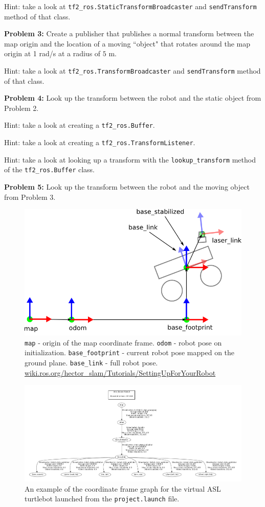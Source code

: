\documentclass{article}
\begin{document}
Hint: take a look at \texttt{tf2\_ros.StaticTransformBroadcaster} and \texttt{sendTransform} method of that class.

\textbf{Problem 3:} Create a publisher that publishes a normal transform between the map origin and the location of a moving ``object" that rotates around the map origin at 1 rad/s at a radius of $5$ m.

Hint: take a look at \texttt{tf2\_ros.TransformBroadcaster} and \texttt{sendTransform} method of that class.

\textbf{Problem 4:} Look up the transform between the robot and the static object from Problem 2.

Hint: take a look at creating a \texttt{tf2\_ros.Buffer}.

Hint: take a look at creating a \texttt{tf2\_ros.TransformListener}.

Hint: take a look at looking up a transform with the \texttt{lookup\_transform} method of the \texttt{tf2\_ros.Buffer} class.

\textbf{Problem 5:} Look up the transform between the robot and the moving object from Problem 3.

\newpage
\begin{figure}[H]
\centering
\includegraphics[width=0.5\linewidth]{s9/figs/coordsystems_img.png}
\caption{\texttt{map} - origin of the map coordinate frame. \texttt{odom} - robot pose on initialization. \texttt{base\_footprint} - current robot pose mapped on the ground plane. \texttt{base\_link} - full robot pose. 
\href{http://wiki.ros.org/hector\_slam/Tutorials/SettingUpForYourRobot}{wiki.ros.org/hector\_slam/Tutorials/SettingUpForYourRobot}
\label{fig:convention}
}

\end{figure}
\begin{figure}[H]
\centering
\includegraphics[width=\linewidth]{s9/figs/frames.pdf}
\caption{An example of the coordinate frame graph for the virtual ASL turtlebot launched from the \texttt{project.launch} file.}\label{fig:frames}
\end{figure}
\end{document}
